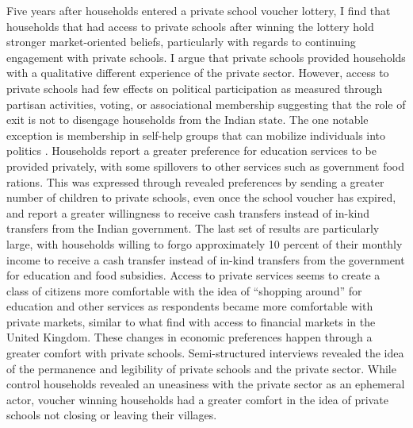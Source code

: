 \documentclass[hidelinks, 12pt, titlepage]{article}
\begin{document}
	Five years after households entered a private school voucher lottery, I find that households that had access to private schools after winning the lottery hold stronger market-oriented beliefs, particularly with regards to continuing engagement with private schools.  I argue that private schools provided households with a qualitative different experience of the private sector.  However, access to private schools had few effects on political participation as measured through partisan activities, voting, or associational membership suggesting that the role of exit is not to disengage households from the Indian state. The one notable exception is membership in self-help groups that can mobilize individuals into politics \citep{Prillaman2022}.  Households report a greater preference for education services to be provided privately, with some spillovers to other services such as government food rations.  This was expressed through revealed preferences by sending a greater number of children to private schools, even once the school voucher has expired, and report a greater willingness to receive cash transfers instead of in-kind transfers from the Indian government.  The last set of results are particularly large, with households willing to forgo approximately 10 percent of their monthly income to receive a cash transfer instead of in-kind transfers from the government for education and food subsidies.  Access to private services seems to create a class of citizens more comfortable with the idea of ``shopping around'' for education and other services \citep{Jeffery2008} as respondents became more comfortable with private markets, similar to what \cite{Margalit2020} find with access to financial markets in the United Kingdom.  These changes in economic preferences happen through a greater comfort with private schools.  Semi-structured interviews revealed the idea of the permanence and legibility of private schools and the private sector.  While control households revealed an uneasiness with the private sector as an ephemeral actor, voucher winning households had a greater comfort in the idea of private schools not closing or leaving their villages.
\end{document}

